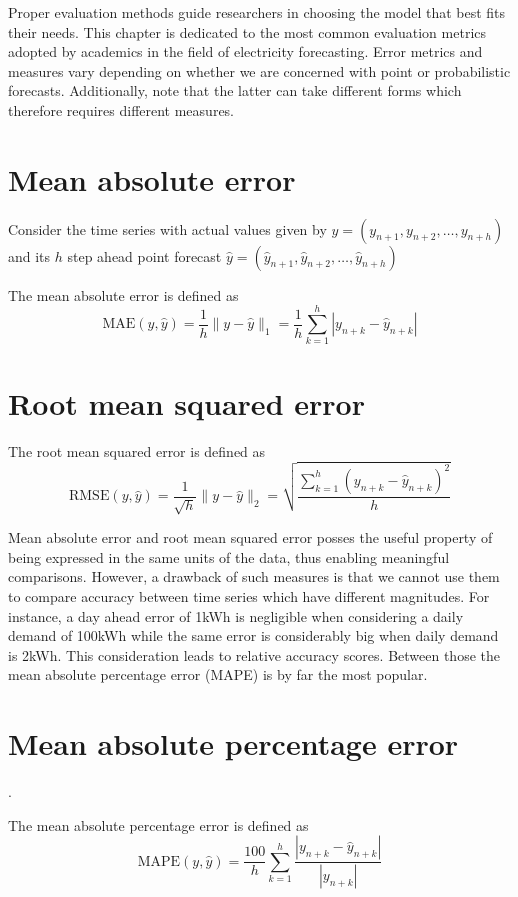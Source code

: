 Proper evaluation methods guide researchers in choosing the model that best fits their needs. This chapter is dedicated to the most common evaluation metrics adopted by academics in the field of electricity forecasting. Error metrics and measures vary depending on whether we are concerned with point or probabilistic forecasts. Additionally, note that the latter can take different forms which therefore requires different measures.
\section{Mean absolute error}\label{mae}
Consider the time series with actual values given by $y=(y_{n+1}, y_{n+2},\dots, y_{n+h})$
and its $h$ step ahead point forecast $\hat{y}=(\hat{y}_{n+1}, \hat{y}_{n+2},\dots, \hat{y}_{n+h})$
\begin{definition}
    The mean absolute error is defined as
    $$
    \mathrm{MAE}(y,\hat{y})=\frac{1}{h}\| y- \hat{y}\|_{1}=\frac{1}{h}\sum\limits_{k=1}^{h}|y_{n+k}-\hat{y}_{n+k}|
    $$
\end{definition}

\section{Root mean squared error}\label{rmse}
\begin{definition}
    The root mean squared error is defined as
    $$
    \mathrm{RMSE}(y, \hat{y})=\frac{1}{\sqrt{h}}\|y-\hat{y}\|_{2}=\sqrt{\frac{\sum\limits_{k=1}^{h}(y_{n+k}- \hat{y}_{n+k})^2}{h}}
    $$
\end{definition}

Mean absolute error and root mean squared error posses the useful property of being expressed in the same units of the data, thus enabling meaningful comparisons.
However, a drawback of such measures is that we cannot use them to compare accuracy between time series which have different magnitudes. For instance, a day ahead error of 1kWh is negligible when considering a daily demand of 100kWh while the same error is considerably big when daily demand is 2kWh. This consideration leads to relative accuracy scores. Between those the mean absolute percentage error (MAPE) is by far the most popular.


\section{Mean absolute percentage error}\label{mape}. 
\begin{definition}
    The mean absolute percentage error is defined as
    $$
    \mathrm{MAPE}(y,\hat{y})=\frac{100}{h}\sum\limits_{k=1}^{h}\frac{|y_{n+k}-\hat{y}_{n+k}|}{|y_{n+k}|}$$
\end{definition}

